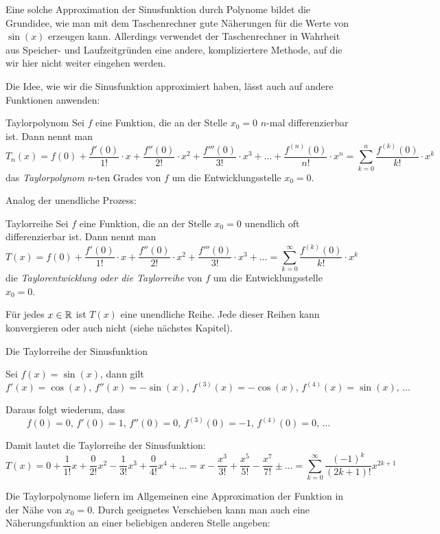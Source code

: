 Eine solche Approximation der Sinusfunktion durch Polynome bildet die Grundidee, wie man mit dem Taschenrechner gute Näherungen für die Werte von $\sin(x)$ erzeugen kann. Allerdings verwendet der Taschenrechner in Wahrheit aus Speicher- und Laufzeitgründen eine andere, kompliziertere Methode, auf die wir hier nicht weiter eingehen werden.

Die Idee, wie wir die Sinusfunktion approximiert haben, lässt auch auf andere Funktionen anwenden:
\begin{definition}
	{Taylorpolynom}{}
	Sei $f$ eine Funktion, die an der Stelle $x_0=0$ $n$-mal differenzierbar ist. Dann nennt man
	\[
		T_n(x) = f(0) + \frac{f'(0)}{1!} \cdot x + \frac{f''(0)}{2!} \cdot x^2 + \frac{f'''(0)}{3!} \cdot x^3 + \ldots + \frac{f^{(n)}(0)}{n!} \cdot x^n = \sum_{k=0}^{n} \frac{f^{(k)}(0)}{k!} \cdot x^k
	\]
	das \emph{Taylorpolynom} $n$-ten Grades von $f$ um die Entwicklungsstelle $x_0=0$.
\end{definition}
Analog der unendliche Prozess:
\begin{definition}
	{Taylorreihe}{}
	Sei $f$ eine Funktion, die an der Stelle $x_0=0$ unendlich oft differenzierbar ist. Dann nennt man
	\[
		T(x) = f(0) + \frac{f'(0)}{1!} \cdot x + \frac{f''(0)}{2!} \cdot x^2 + \frac{f'''(0)}{3!} \cdot x^3 + \ldots = \sum_{k=0}^{\infty} \frac{f^{(k)}(0)}{k!} \cdot x^k
	\]
	die \emph{Taylorentwicklung oder die Taylorreihe} von $f$ um die Entwicklungsstelle $x_0=0$.
\end{definition}

Für jedes $x\in \mathbb{R}$ ist $T(x)$ eine unendliche Reihe. Jede dieser Reihen kann konvergieren oder auch nicht (siehe nächstes Kapitel).
\begin{bsp}
	{Die Taylorreihe der Sinusfunktion}{}

	Sei \( f(x) = \sin(x) \), dann gilt \[ f'(x) = \cos(x), \, f''(x) = -\sin(x) ,\, f^{(3)}(x) = -\cos(x) ,\,  f^{(4)}(x) = \sin(x) ,\, \ldots\]

	Daraus folgt wiederum, dass \[ f(0) = 0 ,\,  f'(0) = 1 ,\, f''(0) = 0 ,\,  f^{(3)}(0) = -1 ,\,  f^{(4)}(0) = 0 ,\, \ldots \]

	Damit lautet die Taylorreihe der Sinusfunktion:
	\[
		T(x) = 0 + \frac{1}{1!}x + \frac{0}{2!}x^2 - \frac{1}{3!}x^3 + \frac{0}{4!}x^4 + \ldots
		= x - \frac{x^3}{3!} + \frac{x^5}{5!} - \frac{x^7}{7!} \pm \ldots
		= \sum_{k=0}^{\infty} \frac{(-1)^k}{(2k+1)!}x^{2k+1}
	\]
\end{bsp}

Die Taylorpolynome liefern im Allgemeinen eine Approximation der Funktion in der Nähe von $x_0=0$. Durch geeignetes Verschieben kann man auch eine Näherungsfunktion an einer beliebigen anderen Stelle angeben:

